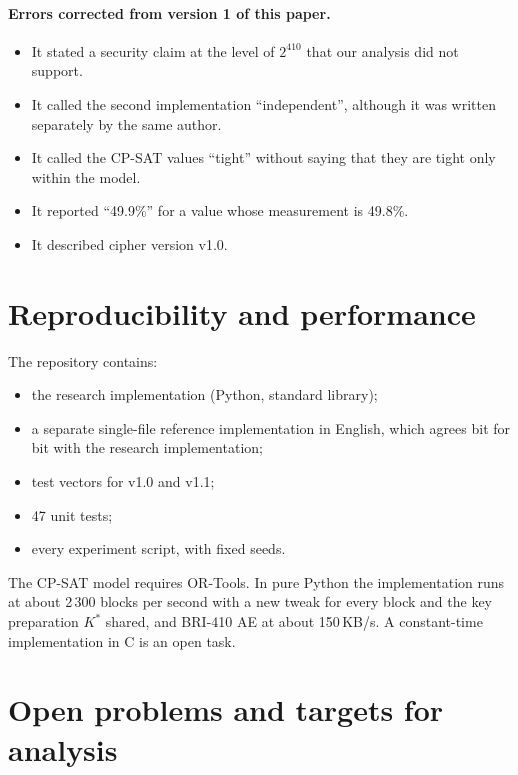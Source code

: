 \documentclass[11pt,a4paper]{article}
\begin{document}
\paragraph{Errors corrected from version 1 of this paper.}
\begin{itemize}
\item It stated a security claim at the level of $2^{410}$ that our analysis did not support.
\item It called the second implementation ``independent'', although it was written separately by the same author.
\item It called the CP-SAT values ``tight'' without saying that they are tight only within the model.
\item It reported ``49.9\%'' for a value whose measurement is 49.8\%.
\item It described cipher version v1.0.
\end{itemize}

\section{Reproducibility and performance}\label{sec:perf}

The repository contains:
\begin{itemize}
\item the research implementation (Python, standard library);
\item a separate single-file reference implementation in English, which agrees bit for bit with the research
  implementation;
\item test vectors for v1.0 and v1.1;
\item 47 unit tests;
\item every experiment script, with fixed seeds.
\end{itemize}
The CP-SAT model requires OR-Tools. In pure Python the implementation runs at about 2\,300 blocks per second with a
new tweak for every block and the key preparation $K^*$ shared, and BRI-410 AE at about 150\,KB/s. A constant-time
implementation in C is an open task.

\section{Open problems and targets for analysis}\label{sec:open}
\end{document}
